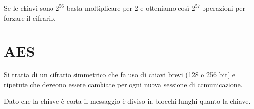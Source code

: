 Se le chiavi sono $2^{56}$ basta moltiplicare per 2 e otteniamo cos\`i $2^{57}$ operazioni per forzare il cifrario.

\section{AES}\label{AES}
Si tratta di un cifrario simmetrico che fa uso di chiavi brevi (128 o 256 bit) e ripetute che deveono essere cambiate
per ogni nuova sessione di comunicazione.

Dato che la chiave \`e corta il messaggio \`e diviso in blocchi lunghi quanto la chiave.
